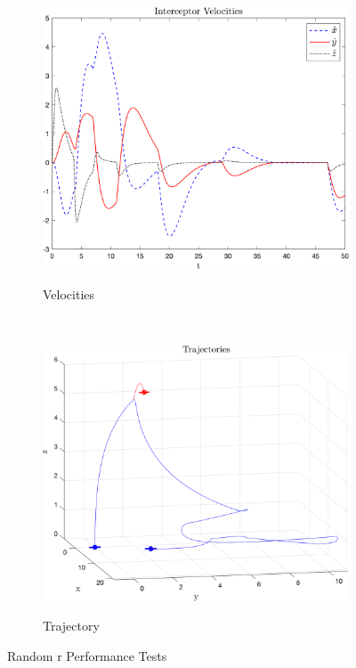 \documentclass{article}
\begin{document}
\begin{multicols}{2}
\begin{figure}[H]
\begin{subfigure}[b]{0.49\columnwidth}
    \includegraphics[width = 1\textwidth]{images/VelocityRandom.png}
     \label{fig:VRandom}
     \vspace{-5mm}
      \caption{Velocities}
 \end{subfigure}\\
 \bigskip
\begin{subfigure}[b]{1.0\columnwidth}
    \centering
    \includegraphics[width = 1\textwidth]{images/InterceptRandom.png}
     \label{fig:RandTraj}
     \vspace{-5mm}
     \caption{Trajectory}
 \end{subfigure}
    \caption{Random r Performance Tests}
     \label{fig:Randr}
\end{figure}

\end{multicols}
\end{document}
